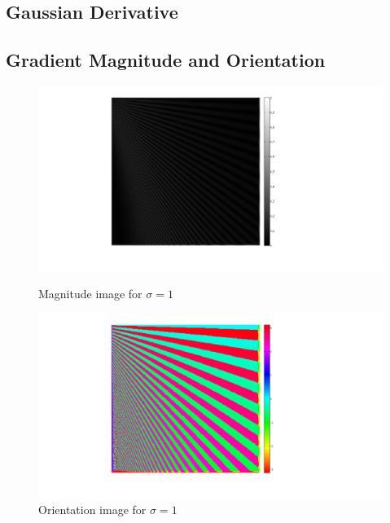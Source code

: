 \documentclass[a4paper,10pt]{article}
\begin{document}
\subsection{Gaussian Derivative}


\subsection{Gradient Magnitude and Orientation}
\begin{figure}[ht]
\begin{minipage}[b]{0.45\linewidth}
\centering
\includegraphics[width=\textwidth]{pn1_img/magnitude_sigma1}
\caption{Magnitude image for $\sigma=1$}
\end{minipage}
\hspace{0.1cm}
\begin{minipage}[b]{0.45\linewidth}
\centering
\includegraphics[width=\textwidth]{pn1_img/orientation_sigma1}
\caption{Orientation image for $\sigma=1$}
\end{minipage}
\end{figure}
\end{document}
